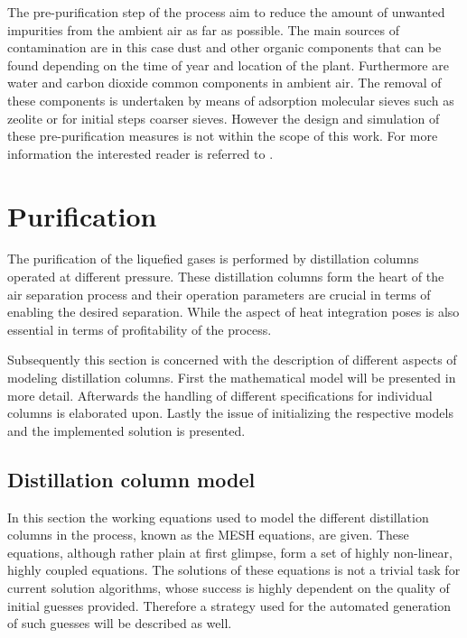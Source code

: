     The pre-purification step of the process aim to reduce the amount of unwanted impurities
    from the ambient air as far as possible. The main sources of contamination are in this case
    dust and other organic components that can be found depending on the time of year and
    location of the plant. Furthermore are water and carbon dioxide common components in
    ambient air. The removal of these components is undertaken by means of adsorption molecular
    sieves such as zeolite or for initial steps coarser sieves. However the design and simulation
    of these pre-purification measures is not within the scope of this work. For more information
    the interested reader is referred to \cite{Acharya.1996}.


\section{Purification}
\label{sec:SteadyStateModel}
    The purification of the liquefied gases is performed by distillation columns
    operated at different pressure.
    These distillation columns form the heart of the air separation process and their
    operation parameters are crucial in terms of enabling the desired separation.
    While the aspect of heat integration poses is also essential in terms of profitability of
    the process.

    Subsequently this section is concerned with the description of different aspects of
    modeling distillation columns. First the mathematical model will be presented in
    more detail. Afterwards the handling of different specifications for individual
    columns is elaborated upon. Lastly the issue of initializing the respective models
    and the implemented solution is presented.

\subsection{Distillation column model}
\label{sec:SSM:dist}

    In this section the working equations used to model the different distillation
    columns in the process, known as the MESH equations, are given. These equations,
    although rather plain at first glimpse, form a set of highly non-linear, highly
    coupled equations. The solutions of these equations is not a trivial
    task for current solution algorithms, whose success is highly dependent on the
    quality of initial guesses provided. Therefore a strategy used for the automated
    generation of such guesses will be described as well.

